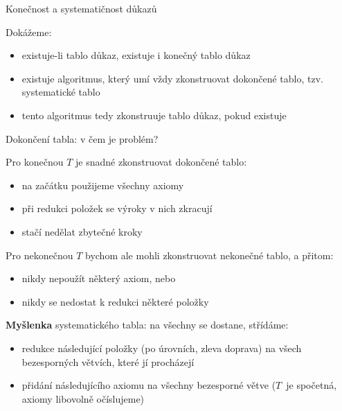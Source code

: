 \documentclass{beamer}
\begin{document}
\begin{frame}{Konečnost a systematičnost důkazů}

    Dokážeme:
    \begin{itemize}[<+->]
        \item existuje-li tablo důkaz, existuje i \alert{konečný} tablo důkaz
        \item existuje algoritmus, který umí vždy zkonstruovat dokončené tablo, tzv. \alert{systematické tablo}
        \item tento algoritmus tedy \alert{zkonstruuje tablo důkaz}, pokud existuje 
        
        \medskip
        
        
        \medskip
    \end{itemize}
    

\end{frame}


\begin{frame}{Dokončení tabla: v čem je problém?}

    \pause
    Pro konečnou $T$ je snadné zkonstruovat dokončené tablo:\pause
    \begin{itemize}
        \item na začátku použijeme všechny axiomy\pause
        \item při redukci položek se výroky v nich zkracují\pause
        \item stačí nedělat zbytečné kroky\pause
    \end{itemize}

    Pro \alert{nekonečnou} $T$ bychom ale mohli zkonstruovat nekonečné tablo, a přitom:\pause
    \begin{itemize}
        \item nikdy nepoužít některý axiom, nebo\pause
        \item nikdy se nedostat k redukci některé položky
    \end{itemize}
    
    \pause
    \textbf{Myšlenka} \alert{systematického tabla}: na všechny se dostane, střídáme:\pause
    \begin{itemize}
        \item \alert{redukce následující položky} (po úrovních, zleva doprava) na všech bezesporných větvích, které jí procházejí \pause
        \item \alert{přidání následujícího axiomu} na všechny bezesporné větve ($T$~je spočetná, axiomy libovolně očíslujeme)         
    \end{itemize}

\end{frame}
\end{document}
